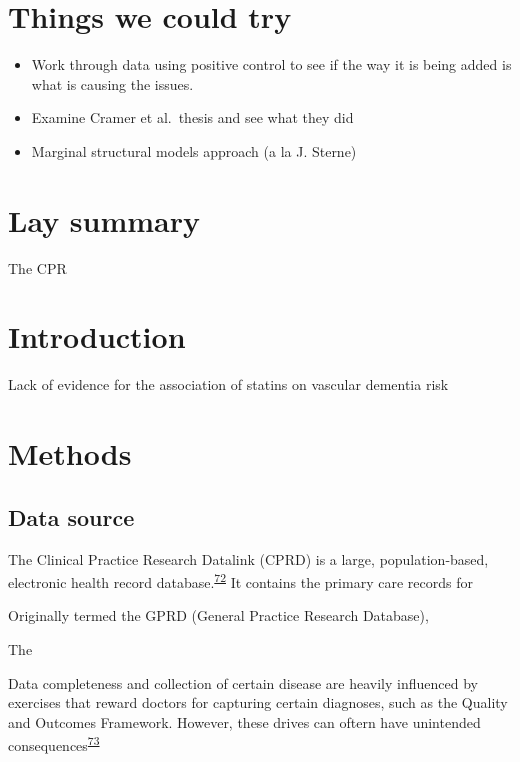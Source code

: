 \documentclass[a4paper, twoside]{templates/ociamthesis}
\providecommand{\tightlist}{%
  \setlength{\itemsep}{0pt}\setlength{\parskip}{0pt}}
\begin{document}
\hypertarget{things-we-could-try}{%
\section{Things we could try}\label{things-we-could-try}}

\begin{itemize}
\tightlist
\item
  Work through data using positive control to see if the way it is being added is what is causing the issues.
\item
  Examine Cramer et al.~thesis and see what they did
\item
  Marginal structural models approach (a la J. Sterne)
\end{itemize}

\hypertarget{lay-summary-3}{%
\section{Lay summary}\label{lay-summary-3}}

The CPR

\hypertarget{introduction-2}{%
\section{Introduction}\label{introduction-2}}

Lack of evidence for the association of statins on vascular dementia risk

\hypertarget{methods-1}{%
\section{Methods}\label{methods-1}}

\hypertarget{data-source}{%
\subsection{Data source}\label{data-source}}

The Clinical Practice Research Datalink (CPRD) is a large, population-based, electronic health record database.\textsuperscript{\protect\hyperlink{ref-herrett2015}{72}} It contains the primary care records for

Originally termed the GPRD (General Practice Research Database),

The

Data completeness and collection of certain disease are heavily influenced by exercises that reward doctors for capturing certain diagnoses, such as the Quality and Outcomes Framework. However, these drives can oftern have unintended consequences\textsuperscript{\protect\hyperlink{ref-liu2019}{73}}
\end{document}
